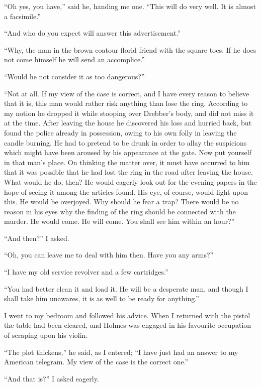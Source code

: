 \documentclass[12pt,english]{book}
\begin{document}
{}``Oh yes, you have,'' said he, handing me one. {}``This will
do very well. It is almost a facsimile.''

{}``And who do you expect will answer this advertisement.''

{}``Why, the man in the brown coat\mdsh{---}our florid friend with
the square toes. If he does not come himself he will send an accomplice.''

{}``Would he not consider it as too dangerous?''

{}``Not at all. If my view of the case is correct, and I have every
reason to believe that it is, this man would rather risk anything
than lose the ring. According to my notion he dropped it while stooping
over Drebber's body, and did not miss it at the time. After leaving
the house he discovered his loss and hurried back, but found the police
already in possession, owing to his own folly in leaving the candle
burning. He had to pretend to be drunk in order to allay the suspicions
which might have been aroused by his appearance at the gate. Now put
yourself in that man's place. On thinking the matter over, it must
have occurred to him that it was possible that he had lost the ring
in the road after leaving the house. What would he do, then? He would
eagerly look out for the evening papers in the hope of seeing it among
the articles found. His eye, of course, would light upon this. He
would be overjoyed. Why should he fear a trap? There would be no reason
in his eyes why the finding of the ring should be connected with the
murder. He would come. He will come. You shall see him within an hour?''

{}``And then?'' I asked.

{}``Oh, you can leave me to deal with him then. Have you any arms?''

{}``I have my old service revolver and a few cartridges.''

{}``You had better clean it and load it. He will be a desperate man,
and though I shall take him unawares, it is as well to be ready for
anything.''

I went to my bedroom and followed his advice. When I returned with
the pistol the table had been cleared, and Holmes was engaged in his
favourite occupation of scraping upon his violin.

{}``The plot thickens,'' he said, as I entered; {}``I have just
had an answer to my American telegram. My view of the case is the
correct one.''

{}``And that is?'' I asked eagerly.
\end{document}
